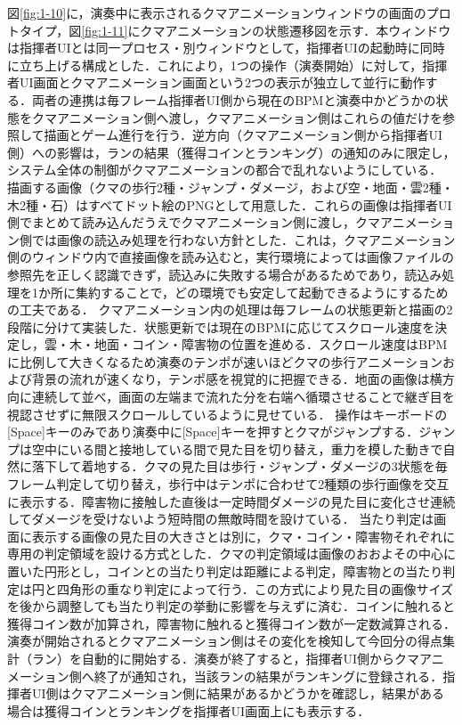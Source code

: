 \documentclass[uplatex,dvipdfmx]{jlreq}
\begin{document}
図\ref{fig:1-10}に，演奏中に表示されるクマアニメーションウィンドウの画面のプロトタイプ，図\ref{fig:1-11}にクマアニメーションの状態遷移図を示す．本ウィンドウは指揮者UIとは同一プロセス・別ウィンドウとして，指揮者UIの起動時に同時に立ち上げる構成とした．これにより，1つの操作（演奏開始）に対して，指揮者UI画面とクマアニメーション画面という2つの表示が独立して並行に動作する．両者の連携は毎フレーム指揮者UI側から現在のBPMと演奏中かどうかの状態をクマアニメーション側へ渡し，クマアニメーション側はこれらの値だけを参照して描画とゲーム進行を行う．逆方向（クマアニメーション側から指揮者UI側）への影響は，ランの結果（獲得コインとランキング）の通知のみに限定し，システム全体の制御がクマアニメーションの都合で乱れないようにしている．
描画する画像（クマの歩行2種・ジャンプ・ダメージ，および空・地面・雲2種・木2種・石）はすべてドット絵のPNGとして用意した．これらの画像は指揮者UI側でまとめて読み込んだうえでクマアニメーション側に渡し，クマアニメーション側では画像の読込み処理を行わない方針とした．これは，クマアニメーション側のウィンドウ内で直接画像を読み込むと，実行環境によっては画像ファイルの参照先を正しく認識できず，読込みに失敗する場合があるためであり，読込み処理を1か所に集約することで，どの環境でも安定して起動できるようにするための工夫である．
クマアニメーション内の処理は毎フレームの状態更新と描画の2段階に分けて実装した．状態更新では現在のBPMに応じてスクロール速度を決定し，雲・木・地面・コイン・障害物の位置を進める．スクロール速度はBPMに比例して大きくなるため演奏のテンポが速いほどクマの歩行アニメーションおよび背景の流れが速くなり，テンポ感を視覚的に把握できる．地面の画像は横方向に連続して並べ，画面の左端まで流れた分を右端へ循環させることで継ぎ目を視認させずに無限スクロールしているように見せている．
操作はキーボードの[Space]キーのみであり演奏中に[Space]キーを押すとクマがジャンプする．ジャンプは空中にいる間と接地している間で見た目を切り替え，重力を模した動きで自然に落下して着地する．クマの見た目は歩行・ジャンプ・ダメージの3状態を毎フレーム判定して切り替え，歩行中はテンポに合わせて2種類の歩行画像を交互に表示する．障害物に接触した直後は一定時間ダメージの見た目に変化させ連続してダメージを受けないよう短時間の無敵時間を設けている．
当たり判定は画面に表示する画像の見た目の大きさとは別に，クマ・コイン・障害物それぞれに専用の判定領域を設ける方式とした．クマの判定領域は画像のおおよその中心に置いた円形とし，コインとの当たり判定は距離による判定，障害物との当たり判定は円と四角形の重なり判定によって行う．この方式により見た目の画像サイズを後から調整しても当たり判定の挙動に影響を与えずに済む．コインに触れると獲得コイン数が加算され，障害物に触れると獲得コイン数が一定数減算される．
演奏が開始されるとクマアニメーション側はその変化を検知して今回分の得点集計（ラン）を自動的に開始する．演奏が終了すると，指揮者UI側からクマアニメーション側へ終了が通知され，当該ランの結果がランキングに登録される．指揮者UI側はクマアニメーション側に結果があるかどうかを確認し，結果がある場合は獲得コインとランキングを指揮者UI画面上にも表示する．
\end{document}
